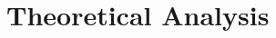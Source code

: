 \documentclass{article}
\begin{document}

\newpage

\appendix



\section{Theoretical Analysis}
\end{document}
